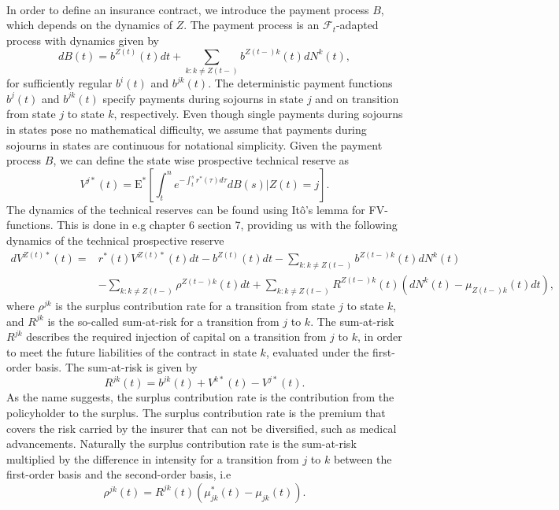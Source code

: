 \documentclass[12pt]{article}
\newcommand{\E}{\text{E}}
\theoremstyle{my_thm}
\theoremstyle{my_def}
\theoremstyle{my_thm2}
\begin{document}
\\
In order to define an insurance contract, we introduce the payment process $B$, which depends on the dynamics of $Z$. The payment process is an $\mathcal{F}_t$-adapted process with dynamics given by
$$
dB(t)=b^{Z(t)}(t) dt +\sum_{k:k \neq Z(t-)} b^{Z(t-)k}(t)dN^k(t),
$$
for sufficiently regular $b^i(t)$ and $b^{jk}(t)$. The deterministic payment functions $b^j(t)$ and $b^{jk}(t)$ specify payments during sojourns in state $j$ and on transition from state $j$ to state $k$, respectively. Even though single payments during sojourns in states pose no mathematical difficulty, we assume that payments during sojourns in states are continuous for notational simplicity. Given the payment process $B$, we can define the state wise prospective technical reserve as
$$
V^{j*}(t)=\E^*\left[ \int_t^n  e^{-\int_t^s r^*(\tau) d\tau} dB(s) |Z(t)=j \right].
$$
The dynamics of the technical reserves can be found using Itô's lemma for FV-functions. This is done in e.g \citep{RaI} chapter 6 section 7, providing us with the following dynamics of the technical prospective reserve
\begin{align}
dV^{Z(t)*}(t)=
&
r^*(t)V^{Z(t)*}(t)dt - b^{Z(t)}(t)dt -\sum_{k:k\neq Z(t-)}b^{Z(t-)k}(t) dN^k(t)\nonumber
\\
&-\sum_{k:k\neq Z(t-)} \rho^{Z(t-)k}(t) dt
+
\sum_{k:k\neq Z(t-)} R^{Z(t-)k}(t)(dN^k(t)-\mu_{Z(t-)k}(t) dt), \label{eq:AAP}
\end{align}
where $\rho^{jk}$ is the surplus contribution rate for a transition from state $j$ to state $k$, and $R^{jk}$ is the so-called sum-at-risk for a transition from $j$ to $k$. The sum-at-risk $R^{jk}$ describes the required injection of capital on a transition from $j$ to $k$, in order to meet the future liabilities of the contract in state $k$, evaluated under the first-order basis. The sum-at-risk is given by
$$
R^{jk}(t)=b^{jk}(t)+V^{k*}(t)-V^{j*}(t).
$$
As the name suggests, the surplus contribution rate is the contribution from the policyholder to the surplus. The surplus contribution rate is the premium that covers the risk carried by the insurer that can not be diversified, such as medical advancements. Naturally the surplus contribution rate is the sum-at-risk multiplied by the difference in intensity for a transition from $j$ to $k$ between the first-order basis and the second-order basis, i.e
$$
\rho^{jk}(t)=R^{jk}(t)(\mu^*_{jk}(t)-\mu_{jk}(t)).
$$
\end{document}
